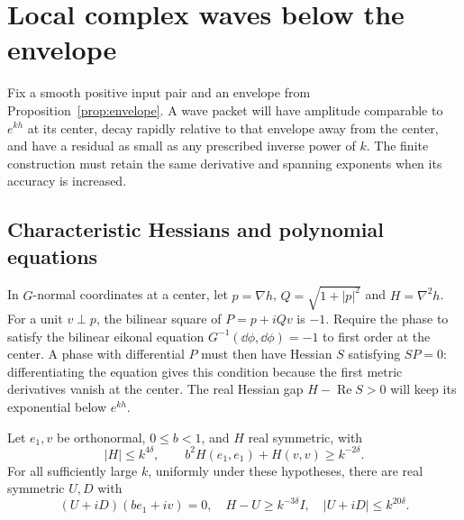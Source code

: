 \section{Local complex waves below the envelope}\label{sec:packets}

Fix a smooth positive input pair and an envelope from
Proposition~\ref{prop:envelope}. A wave packet will have amplitude
comparable to \(e^{kh}\) at its center, decay rapidly relative to
that envelope away from the center, and have a residual as small
as any prescribed inverse power of \(k\). The finite construction
must retain the same derivative and spanning exponents when its
accuracy is increased.

\subsection{Characteristic Hessians and polynomial equations}

In \(G\)-normal coordinates at a center, let
\(p=\nabla h\), \(Q=\sqrt{1+|p|^2}\) and \(H=\nabla^2h\).
For a unit \(v\perp p\), the bilinear square of \(P=p+iQv\) is
\(-1\). Require the phase to satisfy the bilinear eikonal equation
\(G^{-1}(\dd\phi,\dd\phi)=-1\) to first order at the center.
A phase with differential \(P\) must then have Hessian \(S\)
satisfying \(SP=0\): differentiating the equation gives this condition
because the first metric derivatives vanish at the center.
The real Hessian gap \(H-\operatorname{Re}S>0\)
will keep its exponential below \(e^{kh}\).

\begin{lemma}\label{lem:hessian}
Let \(e_1,v\) be orthonormal, \(0\le b<1\), and \(H\) real
symmetric, with
\[
 |H|\le k^{4\delta},\qquad
 b^2H(e_1,e_1)+H(v,v)\ge k^{-2\delta}.
\]
For all sufficiently large \(k\), uniformly under these hypotheses,
there are real symmetric \(U,D\) with
\begin{equation}\label{eq:hessian}
 (U+iD)(be_1+iv)=0,\quad
 H-U\ge k^{-3\delta}I,\quad |U+iD|\le k^{20\delta}.
\end{equation}
\end{lemma}

